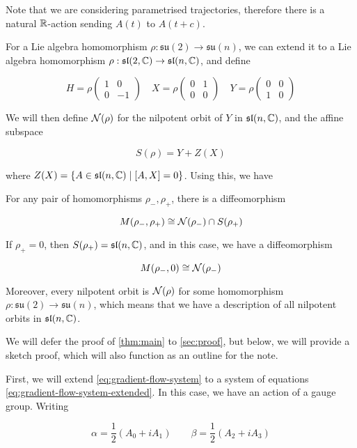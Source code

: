 \documentclass{report}
\newcommand{\su}{\mathfrak{su}}
\renewcommand{\sl}{\mathfrak{sl}}
\begin{document}
Note that we are considering parametrised trajectories, therefore there is a natural \(\mathbb{R}\)-action sending \(A(t)\) to \(A(t+c)\).

For a Lie algebra homomorphism \(\rho : \su(2) \to \su(n)\), we can extend it to a Lie algebra homomorphism \(\rho : \sl(2, \C) \to \sl(n, \C)\), and define

\[H = \rho\begin{pmatrix}
    1 & 0 \\
    0 & -1
\end{pmatrix}\quad X = \rho\begin{pmatrix}
    0 & 1 \\
    0 & 0
\end{pmatrix} \quad Y = \rho\begin{pmatrix}
    0 & 0 \\
    1 & 0
\end{pmatrix}\]

We will then define \(\mathcal{N}(\rho)\) for the nilpotent orbit of \(Y\) in \(\sl(n, \C)\), and the affine subspace

\[S(\rho) = Y + Z(X)\]

where \(Z(X) = \left\{A \in \sl(n, \C) \mid [A, X] = 0\right\}\). Using this, we have

\begin{theorem}
    \label{thm:main}

    For any pair of homomorphisms \(\rho_-, \rho_+\), there is a diffeomorphism

    \[M(\rho_-, \rho_+) \cong \mathcal{N}(\rho_-) \cap S(\rho_+)\]
\end{theorem}

If \(\rho_+ = 0\), then \(S(\rho_+) = \sl(n, \C)\), and in this case, we have a diffeomorphism

\[M(\rho_-, 0) \cong \mathcal{N}(\rho_-)\]

Moreover, every nilpotent orbit is \(\mathcal{N}(\rho)\) for some homomorphism \(\rho : \su(2) \to \su(n)\), which means that we have a description of all nilpotent orbits in \(\sl(n, \C)\).

We will defer the proof of \cref{thm:main} to \cref{sec:proof}, but below, we will provide a sketch proof, which will also function as an outline for the note.

First, we will extend \cref{eq:gradient-flow-system} to a system of equations \cref{eq:gradient-flow-system-extended}. In this case, we have an action of a gauge group. Writing

\[\alpha = \frac{1}{2}(A_0 + iA_1) \qquad \beta = \frac12(A_2 + iA_3)\]
\end{document}
